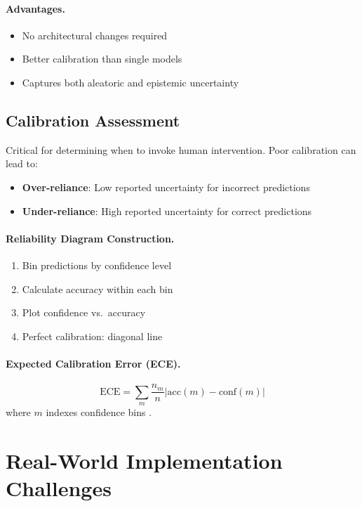 \paragraph{Advantages.}
\begin{itemize}
    \item No architectural changes required
    \item Better calibration than single models
    \item Captures both aleatoric and epistemic uncertainty
\end{itemize}

\subsection{Calibration Assessment}

Critical for determining when to invoke human intervention. Poor calibration can lead to:
\begin{itemize}
    \item \textbf{Over-reliance}: Low reported uncertainty for incorrect predictions
    \item \textbf{Under-reliance}: High reported uncertainty for correct predictions
\end{itemize}

\paragraph{Reliability Diagram Construction.}
\begin{enumerate}
    \item Bin predictions by confidence level
    \item Calculate accuracy within each bin
    \item Plot confidence vs.\ accuracy
    \item Perfect calibration: diagonal line
\end{enumerate}

\paragraph{Expected Calibration Error (ECE).}
\[
\text{ECE} = \sum_{m} \frac{n_m}{n} \bigl|\text{acc}(m) - \text{conf}(m)\bigr|
\]
where $m$ indexes confidence bins \autocite{guo2017calibration}.

\section{Real-World Implementation Challenges}

